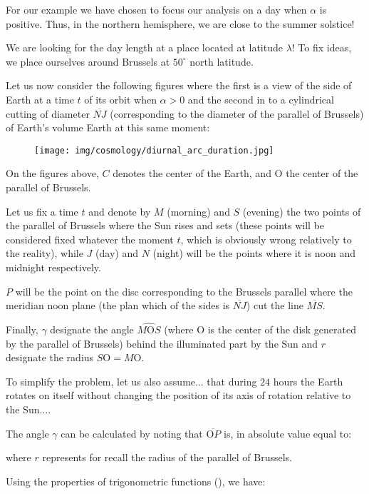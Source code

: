 	For our example we have chosen to focus our analysis on a day when $\alpha$ is positive. Thus, in the northern hemisphere, we are close to the summer solstice!

	We are looking for the day length at a place located at latitude $\lambda$! To fix ideas, we place ourselves around Brussels at $50^\circ$ north latitude.
	
	Let us now consider the following figures where the first is a view of the side of Earth at a time $t$ of its orbit when $\alpha>0$ and the second in to a cylindrical cutting of diameter $\overline{NJ}$ (corresponding to the diameter of the parallel of Brussels) of Earth's volume Earth at this same moment:
	\begin{figure}[H]
		\centering
		\texttt{[image: img/cosmology/diurnal\_arc\_duration.jpg]}
	\end{figure}
	On the figures above, $C$ denotes the center of the Earth, and O the center of the parallel of Brussels.

	Let us fix a time $t$ and denote by $M$ (morning) and $S$ (evening) the two points of the parallel of Brussels where the Sun rises and sets (these points will be considered fixed whatever the moment $t$, which is obviously wrong relatively to the reality), while $J$ (day) and $N$ (night) will be the points where it is noon and midnight respectively.

	$P$ will be the point on the disc corresponding to the Brussels parallel where the meridian noon plane  (the plan which of the sides is $\overline{NJ}$) cut the line $\overline{MS}$.

	Finally, $\gamma$ designate the angle $\widehat{M\text{O}S}$ (where O is the center of the disk generated by the parallel of Brussels) behind the illuminated part by the Sun and $r$ designate the radius $S\text{O}=M\text{O}$.

	To simplify the problem, let us also assume... that during $24$ hours the Earth rotates on itself without changing the position of its axis of rotation relative to the Sun....

	The angle $\gamma$ can be calculated by noting that $\overline{\text{O}P}$ is, in absolute value equal to:
	
	where $r$ represents for recall the radius of the parallel of Brussels.
	
	Using the properties of trigonometric functions (), we have:
	
